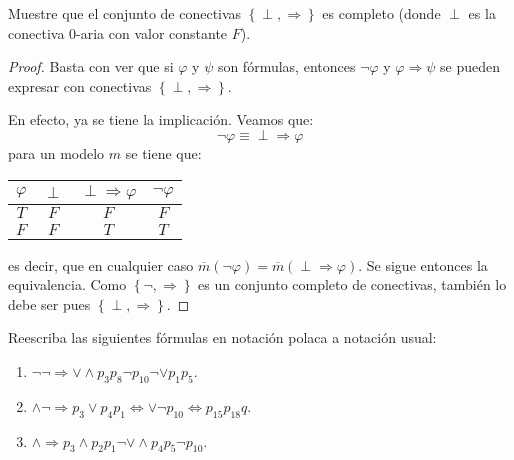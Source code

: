 \documentclass[12pt]{report}
\theoremstyle{largebreak}
\begin{document}
    \begin{excer}
        Muestre que el conjunto de conectivas $\left\{\perp,\Rightarrow \right\}$ es completo (donde $\perp$ es la conectiva $0$-aria con valor constante $F$).
    \end{excer}

    \begin{proof}
        Basta con ver que si $\varphi$ y $\psi$ son fórmulas, entonces $\neg\varphi$ y $\varphi\Rightarrow\psi$ se pueden expresar con conectivas $\left\{\perp,\Rightarrow \right\}$.

        En efecto, ya se tiene la implicación. Veamos que:
        \begin{equation*}
            \neg\varphi \equiv \perp\Rightarrow\varphi
        \end{equation*}
        para un modelo $m$ se tiene que:
        \begin{center}
            \begin{tabular}{ c | c | c | c}
                $\varphi$ & $\perp$ & $\perp\Rightarrow\varphi$ & $\neg\varphi$\\
                \hline
                $T$ & $F$ & $F$ & $F$ \\
                $F$ & $F$ & $T$ & $T$ \\
            \end{tabular}
        \end{center}
        es decir, que en cualquier caso $\overline{m}(\neg\varphi)=\overline{m}(\perp\Rightarrow\varphi)$. Se sigue entonces la equivalencia. Como $\left\{\neg,\Rightarrow \right\}$ es un conjunto completo de conectivas, también lo debe ser pues $\left\{\perp,\Rightarrow \right\}$.
    \end{proof}

    \begin{excer}
        Reescriba las siguientes fórmulas en notación polaca a notación usual:
        \renewcommand{\theenumi}{\alph{enumi}}
        \begin{enumerate}
            \item $\neg\neg\Rightarrow\lor\land p_3p_8\neg p_{10}\neg\lor p_1p_5$.
            \item $\land\neg\Rightarrow p_3\lor p_4p_1\iff\lor\neg p_{10}\iff p_{ 15}p_{18}q$.
            \item $\land\Rightarrow p_3\land p_2p_1\neg\lor\land p_4p_5\neg p_{10}$.
        \end{enumerate}
    \end{excer}
\end{document}
